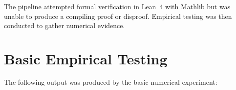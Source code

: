 \documentclass[11pt]{article}
\begin{document}
\begin{center}
\end{center}

The pipeline attempted formal verification in Lean~4 with Mathlib but was unable to
produce a compiling proof or disproof. Empirical testing was then conducted to gather
numerical evidence.

\section{Basic Empirical Testing}

The following output was produced by the basic numerical experiment:
\end{document}
